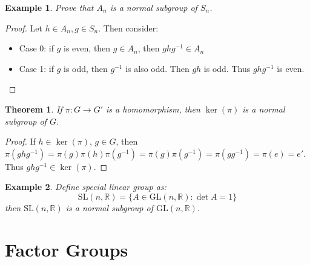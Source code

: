 \documentclass{article}
\theoremstyle{MyNonumberplain}
\theoremstyle{break}
\newtheorem*{proof}{Proof. }
\newcommand{\tmop}{\text}
\theoremstyle{break}
\newtheorem{theorem}{Theorem}[section]
\newtheorem{example}{Example}[section]
\theoremstyle{break}
\theoremstyle{definition}
\theoremstyle{break}
\begin{document}
\begin{expbox}
    \begin{example}
        Prove that $A_n$ is a normal subgroup of $S_n$. 
    \end{example}
    \begin{prfbox}
        \begin{proof}
            Let $h \in A_n, g \in S_n$. Then consider:\\
            \begin{itemize}
            \item Case 0: if $g$ is even, then $g \in A_n$, then $g h g^{- 1} \in A_n$\\
            
            \item Case 1: if $g$ is odd, then $g^{- 1}$ is also odd. Then $g h$ is odd.
            Thus $g h g^{- 1}$ is even. 
            \end{itemize}
        \end{proof}
    \end{prfbox}
\end{expbox}

\begin{thmbox}
    \begin{theorem}
        If $\pi : G \rightarrow G'$ is a homomorphism, then $\ker (\pi)$ is a normal
        subgroup of $G$. 
    \end{theorem}
    \begin{prfbox}
        \begin{proof}
            If $h \in \ker (\pi)$, $g \in G$, then $\pi (g h g^{- 1}) = \pi (g) \pi (h)
            \pi (g^{- 1}) = \pi (g) \pi (g^{- 1}) = \pi (g g^{- 1}) = \pi (e) = e'$. Thus $g h g^{- 1} \in \ker (\pi)$.
        \end{proof}
    \end{prfbox}
\end{thmbox}

\begin{expbox}
    \begin{example}
        Define special linear group as:
        \[ \tmop{SL} (n, \mathbb{R}) = \{ A \in \tmop{GL} (n, \mathbb{R}) : \det A = 1
        \} \]
        then $\tmop{SL} (n, \mathbb{R})$ is a normal subgroup of $\tmop{GL} (n,
        \mathbb{R})$.
    \end{example}
\end{expbox}

\newpage

\section{Factor Groups}
\end{document}
